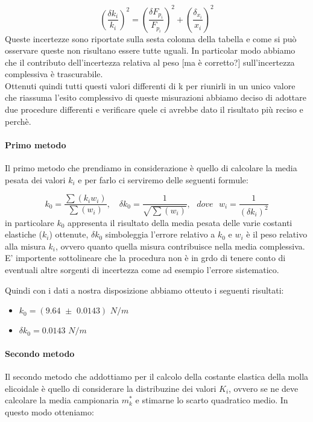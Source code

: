 \begin{equation*}
	\left(\frac{\delta {k_{i}}}{k_{i}}\right)^2  =  \left(\frac{\delta F_{p_{i}}}{F_{p_{i}}}\right)^2  +  \left(\frac{\delta_{x_{i}}}{x_{i}}\right)^2 
\end{equation*}
Queste incertezze sono riportate sulla sesta colonna della tabella e come si può osservare queste non risultano essere tutte uguali. In particolar modo abbiamo che il contributo dell'incertezza relativa al peso [ma è corretto?] sull'incertezza complessiva è trascurabile.\\
Ottenuti quindi tutti questi valori differenti di k per riunirli in un unico valore che riassuma l'esito complessivo di queste misurazioni abbiamo deciso di adottare due procedure differenti e verificare quele ci avrebbe dato il risultato più reciso e perchè.

\paragraph{Primo metodo\\}
Il primo metodo che prendiamo in considerazione è quello di calcolare la media pesata dei valori $k_{i}$ e per farlo ci serviremo delle seguenti formule:

\begin{equation*}
		k_{0} = \frac{\sum (k_i w_i)}{\sum (w_i)} , \,\,\,\,\,\, \delta k_0 = \frac{1}{\sqrt{\sum (w_i)}} , \,\,\,\,dove\,\,\,\, w_i = \frac{1}{(\delta k_i)^2}
\end{equation*}
in particolare $k_0$ appresenta il risultato della media pesata delle varie costanti elastiche ($k_i$) ottenute, $\delta k_0$ simboleggia l'errore relativo a $k_0$ e $w_i$ è il peso relativo alla misura $k_i$, ovvero quanto quella misura contribuisce nella media complessiva. E' importente sottolineare che la procedura non è in grdo di tenere conto di eventuali altre sorgenti di incertezza come ad esempio l'errore sistematico.

Quindi con i dati a nostra disposizione abbiamo otteuto i seguenti risultati:
\begin{itemize}
	\item{  $  k_{0} = (9.64 \,\, \pm \,\, 0.0143)\,\,N/m  $  }
	\item{  $  \delta k_0 = 0.0143 \,\, N/m  $  }
\end{itemize}

\paragraph{Secondo metodo\\}
Il secondo metodo che addottiamo per il calcolo della costante elastica della molla elicoidale è quello di considerare la distribuzine dei valori $K_i$, ovvero se ne deve calcolare la media campionaria $m^*_k$ e stimarne lo scarto quadratico medio. In questo modo otteniamo:

